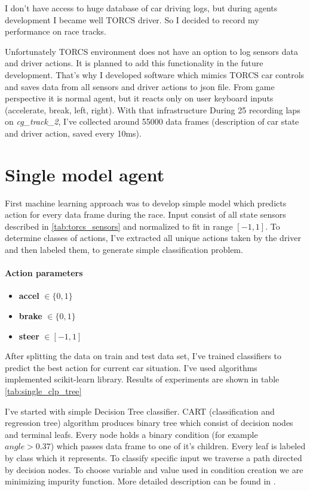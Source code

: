 \documentclass[declaration,shortabstract,english,inz]{iithesis}
\begin{document}
I don't have access to huge database of car driving logs, but during agents development I became well TORCS driver. So I decided to record my performance on race tracks.

Unfortunately TORCS environment does not have an option to log sensors data and driver actions. It is planned to add this functionality in the future development. That's why I developed software which mimics TORCS car controls and saves data from all sensors and driver actions to json file. From game perspective it is normal agent, but it reacts only on user keyboard inputs (accelerate, break, left, right).  With that infrastructure During 25 recording laps on \textit{cg\_track\_2}, I've collected around 55000 data frames (description of car state and driver action, saved every 10ms).

\section{Single model agent}



First machine learning approach was to develop simple model which predicts action for every data frame during the race. Input consist of all state sensors described  in \ref{tab:torcs_sensors} and normalized to fit in range $[-1,1]$. To determine classes of actions, I've extracted all unique actions taken by the driver and then labeled them, to generate simple classification problem.
\paragraph{Action parameters}
\begin{itemize}
    \item \textbf{accel} $\in \{0,1\}$
    \item \textbf{brake} $\in \{0,1\}$ 
    \item \textbf{steer} $\in [-1,1]$
\end{itemize}
After splitting the data on train and test data set, I've trained classifiers to predict the best action for current car situation. I've used algorithms implemented scikit-learn \cite{scikit_learn} library. Results of experiments are shown in table \ref{tab:single_clp_tree}


I've started with simple Decision Tree classifier. CART (classification and regression tree) algorithm produces binary tree which consist of decision nodes and terminal leafs. Every node holds a binary condition (for example $\textit{angle} > 0.37$) which passes data frame to one of it's children. Every leaf is labeled by class which it represents. To classify specific input we traverse a path directed by decision nodes. To choose variable and value used in condition creation we are minimizing impurity function. More detailed description can be found in \cite{Introduction_ML}.
\end{document}
